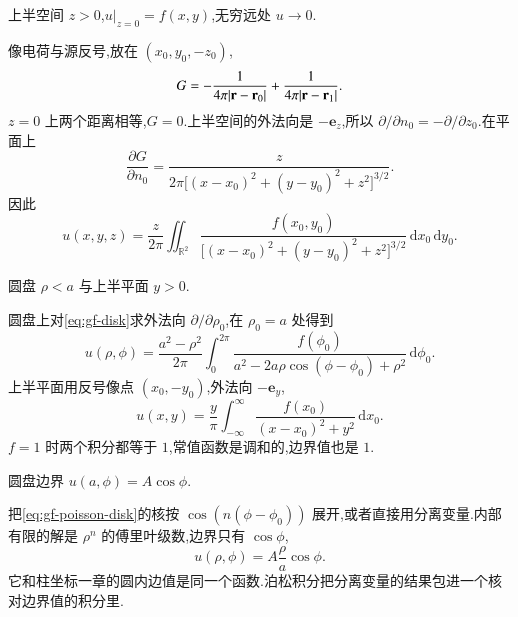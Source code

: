 \begin{example}
上半空间 $z>0$,$u|_{z=0}=f(x,y)$,无穷远处 $u\to 0$.
\end{example}
\begin{solution}
像电荷与源反号,放在 $(x_0,y_0,-z_0)$,
\begin{equation}
  G=-\frac{1}{4\pi|{\mathbf{r}}-{\mathbf{r}}_0|}+\frac{1}{4\pi|{\mathbf{r}}-{\mathbf{r}}_1|}.
\end{equation}
$z=0$ 上两个距离相等,$G=0$.上半空间的外法向是 $-\mathbf{e}_z$,所以 $\partial/\partial n_0=-\partial/\partial z_0$.在平面上
\begin{equation}
  \frac{\partial G}{\partial n_0}
  =\frac{z}{2\pi\bigl[(x-x_0)^2+(y-y_0)^2+z^2\bigr]^{3/2}}.
\end{equation}
因此
\begin{equation}
  u(x,y,z)
  =\frac{z}{2\pi}\iint_{\mathbb{R}^2}
    \frac{f(x_0,y_0)}
         {\bigl[(x-x_0)^2+(y-y_0)^2+z^2\bigr]^{3/2}}
    \,\mathrm{d}x_0\,\mathrm{d}y_0.
  \label{eq:gf-poisson-halfspace}
\end{equation}
\end{solution}

\begin{example}
圆盘 $\rho<a$ 与上半平面 $y>0$.
\end{example}
\begin{solution}
圆盘上对\eqref{eq:gf-disk}求外法向 $\partial/\partial\rho_0$,在 $\rho_0=a$ 处得到
\begin{equation}
  u(\rho,\phi)
  =\frac{a^2-\rho^2}{2\pi}\int_0^{2\pi}
    \frac{f(\phi_0)}
         {a^2-2a\rho\cos(\phi-\phi_0)+\rho^2}
    \,\mathrm{d}\phi_0.
  \label{eq:gf-poisson-disk}
\end{equation}
上半平面用反号像点 $(x_0,-y_0)$,外法向 $-\mathbf{e}_y$,
\begin{equation}
  u(x,y)
  =\frac{y}{\pi}\int_{-\infty}^{\infty}
    \frac{f(x_0)}{(x-x_0)^2+y^2}\,\mathrm{d}x_0.
  \label{eq:gf-poisson-halfplane}
\end{equation}
$f=1$ 时两个积分都等于 $1$,常值函数是调和的,边界值也是 $1$.
\end{solution}

\begin{example}
圆盘边界 $u(a,\phi)=A\cos\phi$.
\end{example}
\begin{solution}
把\eqref{eq:gf-poisson-disk}的核按 $\cos(n(\phi-\phi_0))$ 展开,或者直接用分离变量.内部有限的解是 $\rho^{n}$ 的傅里叶级数,边界只有 $\cos\phi$,
\begin{equation}
  u(\rho,\phi)=A\frac{\rho}{a}\cos\phi.
\end{equation}
它和柱坐标一章的圆内边值是同一个函数.泊松积分把分离变量的结果包进一个核对边界值的积分里.
\end{solution}
